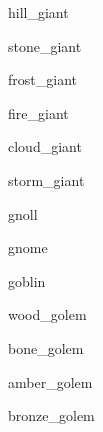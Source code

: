 \documentclass[letterpaper,serif]{module}
\begin{document}

\begin{newmonster}{hill_giant}\end{newmonster}

\begin{newmonster}{stone_giant}\end{newmonster}

\begin{newmonster}{frost_giant}\end{newmonster}

\begin{newmonster}{fire_giant}\end{newmonster}

\begin{newmonster}{cloud_giant}\end{newmonster}

\begin{newmonster}{storm_giant}\end{newmonster}

\begin{newmonster}{gnoll}\end{newmonster}

\begin{newmonster}{gnome}\end{newmonster}

\begin{newmonster}{goblin}\end{newmonster}


\begin{newmonster}{wood_golem}\end{newmonster}

\begin{newmonster}{bone_golem}\end{newmonster}

\begin{newmonster}{amber_golem}\end{newmonster}

\begin{newmonster}{bronze_golem}\end{newmonster}
\end{document}
